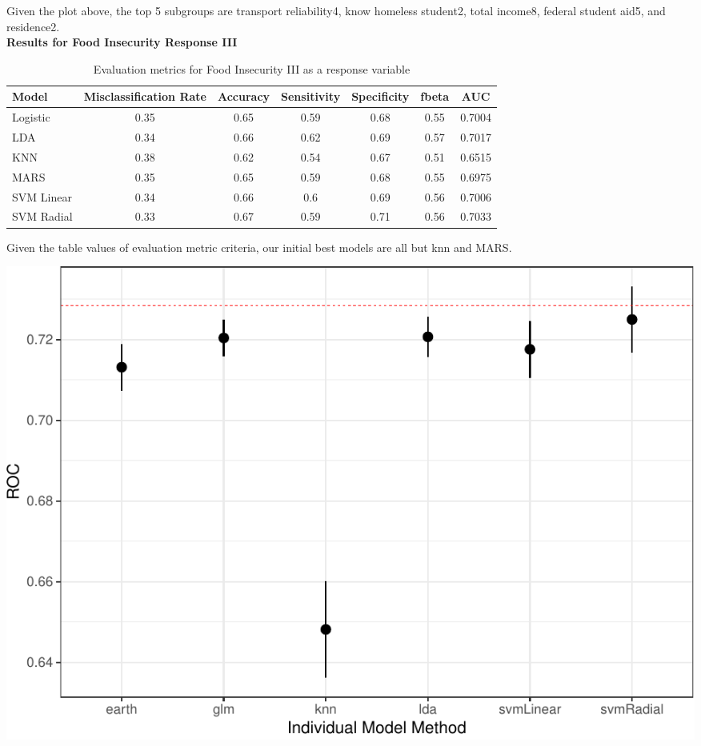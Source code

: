 \documentclass[
  10pt,
]{article}
\begin{document}
Given the plot above, the top 5 subgroups are transport reliability4, know homeless student2, total income8, federal student aid5, and residence2.\\

\textbf{Results for Food Insecurity Response III}

\begin{table}[H]

\caption{\label{tab:unnamed-chunk-25}Evaluation metrics for Food Insecurity III  as a response variable}
\centering
\fontsize{12}{14}\selectfont
\begin{tabular}[t]{lcccccc}
\toprule
Model & Misclassification Rate & Accuracy & Sensitivity & Specificity & fbeta & AUC\\
\midrule
Logistic & 0.35 & 0.65 & 0.59 & 0.68 & 0.55 & 0.7004\\
LDA & 0.34 & 0.66 & 0.62 & 0.69 & 0.57 & 0.7017\\
KNN & 0.38 & 0.62 & 0.54 & 0.67 & 0.51 & 0.6515\\
MARS & 0.35 & 0.65 & 0.59 & 0.68 & 0.55 & 0.6975\\
SVM Linear & 0.34 & 0.66 & 0.6 & 0.69 & 0.56 & 0.7006\\
SVM Radial & 0.33 & 0.67 & 0.59 & 0.71 & 0.56 & 0.7033\\
\bottomrule
\end{tabular}
\end{table}

Given the table values of evaluation metric criteria, our initial best models are all but knn and MARS.\\

\begin{center}\includegraphics{final_phase2_report_files/figure-latex/unnamed-chunk-26-1} \end{center}
\end{document}
